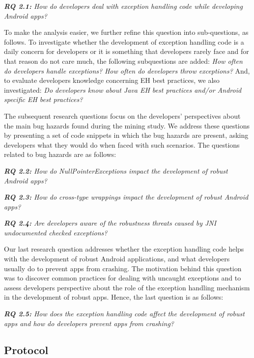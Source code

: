 {\emph{\textbf{RQ 2.1:} How do developers deal with exception handling code while developing Android apps?}

To make the analysis easier, we further refine this question into sub-questions, as follows. To investigate whether the development of exception handling code is a daily concern for developers or it is something that developers rarely face and for that reason do not care much, the following subquestions are added: \emph{How often do developers handle exceptions?} \emph{How often do developers throw exceptions?} And, to evaluate developers knowledge concerning EH best practices, we also investigated: \emph{Do developers know about Java EH best practices and/or Android specific EH best practices?}

The subsequent research questions focus on the developers' perspectives about the main bug hazards found during the mining study. We address these questions by presenting a set of code snippets in which the bug hazards are present, asking developers what they would do when faced with such scenarios. The questions related to bug hazards are as follows:

\emph{\textbf{RQ 2.2:} How do NullPointerExceptions impact the development of robust Android apps?}

\emph{\textbf{RQ 2.3:} How do cross-type wrappings impact the development of robust Android apps?}

\emph{\textbf{RQ 2.4:} Are developers aware of the robustness threats caused by JNI undocumented checked exceptions?}

Our last research question addresses whether the exception handling code helps with the development of robust Android applications, and what developers usually do to prevent apps from crashing. The motivation behind this question was to discover common practices for dealing with uncaught exceptions and to assess developers perspective about the role of the exception handling mechanism in the development of robust apps. Hence, the last question is as follows:

\emph{\textbf{RQ 2.5:} How does the exception handling code affect the development of robust apps and how do developers prevent apps from crashing?}

\subsection{Protocol}


}
